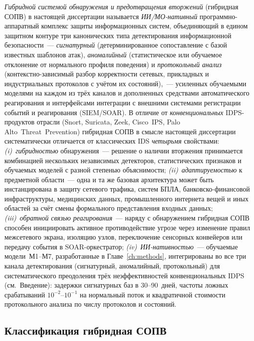 \emph{Гибридной системой обнаружения и предотвращения вторжений}
(гибридная СОПВ) в настоящей диссертации называется \emph{ИИ/МО-нативный}
программно-аппаратный комплекс защиты информационных систем,
объединяющий в едином защитном контуре три канонических типа
детектирования информационной безопасности~--- \emph{сигнатурный}
(детерминированное сопоставление с базой известных шаблонов атак),
\emph{аномалийный} (статистическое или обучаемое отклонение от
нормального профиля поведения) и \emph{протокольный анализ}
(контекстно-зависимый разбор корректности сетевых, прикладных и
индустриальных протоколов с учётом их состояний),~--- усиленных
обучаемыми моделями на каждом из трёх каналов и дополненных
средствами автоматического реагирования и интерфейсами интеграции с
внешними системами регистрации событий и реагирования (SIEM/SOAR).
В отличие от \emph{конвенциональных} IDPS-продуктов отрасли (Snort,
Suricata, Zeek, Cisco~IPS, Palo Alto~Threat~Prevention) гибридная СОПВ
в смысле настоящей диссертации систематически отличается от
классических IDS \emph{четырьмя} свойствами: \emph{(i)}~\emph{гибридностью} обнаружения~--- решение о
наличии вторжения принимается комбинацией нескольких независимых
детекторов, статистических признаков и обучаемых моделей с разной
степенью объяснимости; \emph{(ii)}~\emph{адаптируемостью} к
предметной области~--- одна и та же базовая архитектура может быть
инстанцирована в защиту сетевого трафика, систем БПЛА,
банковско-финансовой инфраструктуры, медицинских данных,
промышленного интернета вещей и иных областей за счёт смены
формального представления входных данных; \emph{(iii)}~\emph{обратной
связью реагирования}~--- наряду с обнаружением гибридная СОПВ
способен инициировать активное противодействие угрозе через изменение
правил межсетевого экрана, изоляцию узлов, переключение сенсорных
конвейеров или передачу события в SOAR-оркестратор;
\emph{(iv)}~\emph{ИИ-нативностью}~--- обучаемые модели~М1--М7,
разработанные в Главе~\ref{ch:methods}, интегрированы во все три
канала детектирования (сигнатурный, аномалийный, протокольный) для
систематического преодоления трёх неэффективностей конвенциональных
IDPS (см.~Введение): задержки сигнатурных баз в 30--90~дней,
частоты ложных срабатываний $10^{-2}$--$10^{-1}$ на нормальный
поток и квадратичной стоимости протокольного анализа по числу
протоколов и состояний.

\subsection{Классификация гибридная СОПВ}
\label{subsec:idps_classification}

